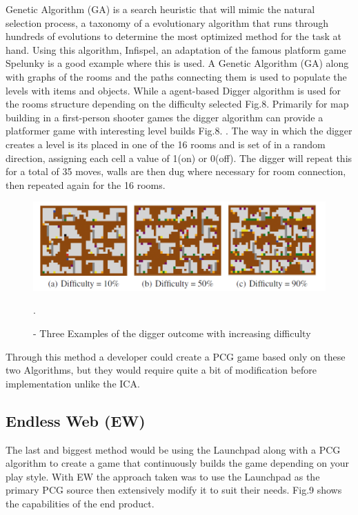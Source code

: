 \documentclass{scrartcl}
\begin{document}
Genetic Algorithm (GA) is a search heuristic that will mimic the natural selection process, a taxonomy of a evolutionary algorithm that runs through hundreds of evolutions to determine the most optimized method for the task at hand\cite{tax}. Using this algorithm, Infispel, an adaptation of the famous platform game Spelunky is a good example where this is used. A Genetic Algorithm (GA) along with graphs of the rooms and the paths connecting them is used to populate the levels with items and objects. While a agent-based Digger algorithm is used for the rooms structure depending on the difficulty selected Fig.8. Primarily for map building in a first-person shooter games the digger algorithm can provide a platformer game with interesting level builds Fig.8. \cite{walaa}. The way in which the digger creates a level is its placed in one of the 16 rooms and is set of in a random direction, assigning each cell a value of 1(on) or 0(off). The digger will repeat this for a total of 35 moves, walls are then dug where necessary for room connection, then repeated again for the 16 rooms.  
\newline
\begin{figure}[h]
	\centering
	\includegraphics[width=0.7\linewidth]{Fig8}
	\caption{ - Three Examples of the digger outcome with increasing difficulty}.
	\label{Fig8}
\end{figure}\cite{walaa}

Through this method a developer could create a PCG game based only on these two Algorithms, but they would require quite a bit of modification before implementation unlike the ICA\cite{walaa,fausto}.

\subsection{Endless Web (EW)}

The last and biggest method would be using the Launchpad along with a PCG algorithm to create a game that continuously builds the game depending on your play style\cite{web}. With EW the approach taken was to use the Launchpad as the primary PCG source then extensively modify it to suit their needs. Fig.9 shows the capabilities of the end product.
\end{document}
